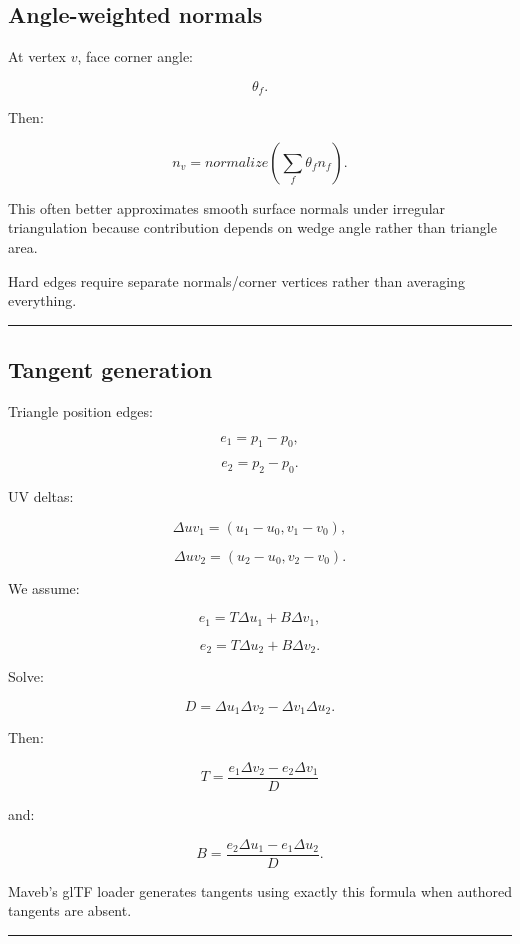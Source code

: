 \subsection{Angle-weighted normals}\label{04-visual-computing-ii-ch041-angle-weighted-normals}

At vertex \(v\), face corner angle:

\[
\theta_f.
\]

Then:

\[
\boxed{
n_v=
normalize
\left(
\sum_f
\theta_fn_f
\right).
}
\]

This often better approximates smooth surface normals under irregular triangulation because contribution depends on wedge angle rather than triangle area.

Hard edges require separate normals/corner vertices rather than averaging everything.

\begin{center}\rule{0.5\linewidth}{0.5pt}\end{center}

\subsection{Tangent generation}\label{04-visual-computing-ii-ch041-tangent-generation}

Triangle position edges:

\[
e_1=p_1-p_0,
\]

\[
e_2=p_2-p_0.
\]

UV deltas:

\[
\Delta uv_1=
(u_1-u_0,v_1-v_0),
\]

\[
\Delta uv_2=
(u_2-u_0,v_2-v_0).
\]

We assume:

\[
e_1=
T\Delta u_1+
B\Delta v_1,
\]

\[
e_2=
T\Delta u_2+
B\Delta v_2.
\]

Solve:

\[
D=
\Delta u_1\Delta v_2
-
\Delta v_1\Delta u_2.
\]

Then:

\[
\boxed{
T=
\frac{
e_1\Delta v_2-
e_2\Delta v_1
}{D}
}
\]

and:

\[
\boxed{
B=
\frac{
e_2\Delta u_1-
e_1\Delta u_2
}{D}.
}
\]

Maveb's glTF loader generates tangents using exactly this formula when authored tangents are absent.

\begin{center}\rule{0.5\linewidth}{0.5pt}\end{center}

